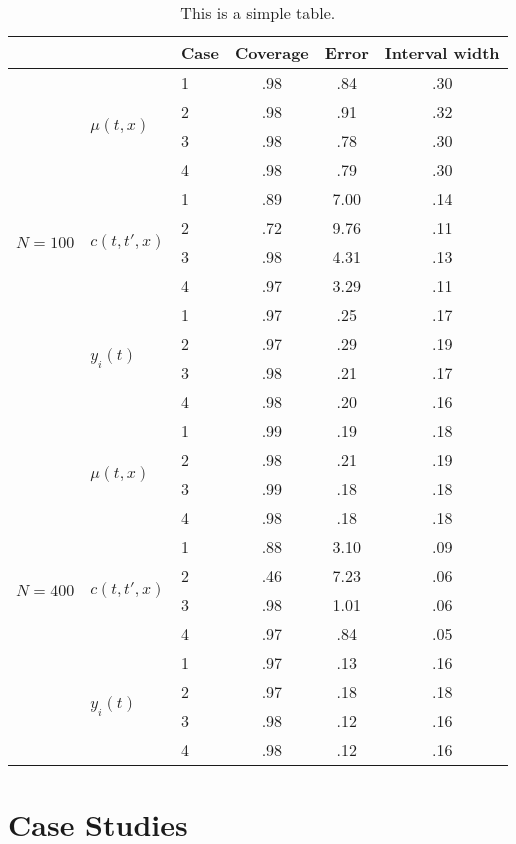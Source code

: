 \documentclass[useAMS,referee,usenatbib]{biom}
\begin{document}
\begin{table}
	\caption{This is a simple table.}
	\label{t:one}
	\begin{center}
		\begin{tabular}{lllccc}
			\Hline
			 & &Case & Coverage&  Error &  Interval width\\ \hline
			\multirow{12}{*}{$N=100$} & \multirow{4}{*}{$\mu(t,x)$}  & 1 &  .98&  .84& .30 \\
			&& 2 & .98& .91& .32 \\
			&& 3 & .98& .78& .30\\
			&& 4 & .98& .79& .30\\
			\cline{2-6}
			&\multirow{4}{*}{$c(t,t',x)$} & 1 & .89& 7.00& .14\\
			&& 2 &.72&9.76&.11\\
			&& 3 &.98&4.31&.13\\
			&& 4 &.97&3.29&.11\\
			\cline{2-6}
			&\multirow{4}{*}{$y_{i}(t)$} & 1 & .97& .25& .17\\
			&& 2 &.97&.29&.19\\
			&& 3 &.98&.21&.17\\
			&& 4 &.98&.20&.16\\
			\hline
			\multirow{12}{*}{$N=400$} & \multirow{4}{*}{$\mu(t,x)$}  & 1 &.99 & .19& .18 \\
			&& 2 & .98& .21& .19 \\
			&& 3 &.99 & .18& .18 \\
			&& 4 &.98 & .18& .18\\
			\cline{2-6}
			&\multirow{4}{*}{$c(t,t',x)$} & 1 & .88 & 3.10& .09\\
			&& 2 & .46&7.23&.06\\
			&& 3 &.98&1.01&.06\\
			&& 4 &.97&.84&.05\\
			\cline{2-6}
			&\multirow{4}{*}{$y_{i}(t)$} & 1 &.97 & .13 &.16 \\
			&& 2 &.97&.18&.18\\
			&& 3 &.98&.12&.16\\
			&& 4 &.98&.12&.16\\
		\end{tabular}
	\end{center}
\end{table}

\section{Case Studies}
\label{s:data}
\end{document}
